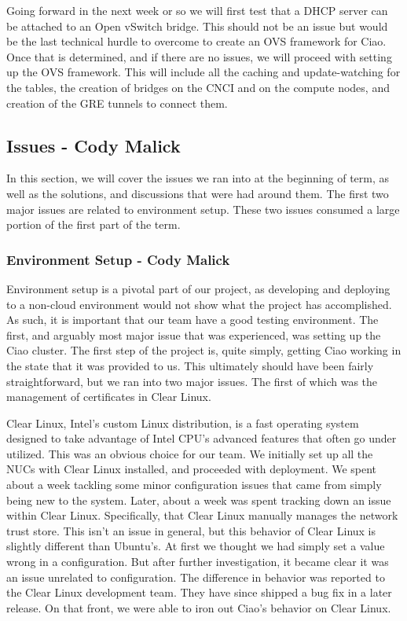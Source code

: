 \documentclass[10pt,onecolumn,journal,draftclsnofoot]{IEEEtran}
\begin{document}
Going forward in the next week or so we will first test that a DHCP server can
be attached to an Open vSwitch bridge. This should not be an issue but would be
the last technical hurdle to overcome to create an OVS framework for Ciao. Once
that is determined, and if there are no issues, we will proceed with setting up
the OVS framework. This will include all the caching and update-watching for
the tables, the creation of bridges on the CNCI and on the compute nodes, and
creation of the GRE tunnels to connect them.

\subsection{Issues - Cody Malick}
In this section, we will cover the issues we ran into at the beginning of term,
as well as the solutions, and discussions that were had around them. The first
two major issues are related to environment setup. These two issues consumed a
large portion of the first part of the term.

\subsubsection{Environment Setup - Cody Malick}
Environment setup is a pivotal part of our project, as developing and deploying
to a non-cloud environment would not show what the project has accomplished.
As such, it is important that our team have a good testing
environment. The first, and arguably most major issue that was experienced,
was setting up the Ciao cluster. The first step of the project is, quite simply,
getting Ciao working in the state that it was provided to us. This ultimately
should have been fairly straightforward, but we ran into two major issues. 
The first of which was the management of certificates in Clear Linux.

Clear Linux, Intel's custom Linux distribution, is a fast operating system
designed to take advantage of Intel CPU's advanced features that often go
under utilized. This was an obvious choice for our team. We initially set up
all the NUCs with Clear Linux installed, and proceeded with deployment.
We spent about a week tackling some minor configuration issues that came from
simply being new to the system. Later, about a week was spent tracking down an
issue within Clear Linux. Specifically, that Clear Linux manually manages the
network trust store. This isn't an issue in general, but this behavior of Clear
Linux is slightly different than Ubuntu's. At first we thought we had simply
set a value wrong in a configuration. But after further investigation, it
became clear it was an issue unrelated to configuration. The difference in 
behavior was reported to the Clear Linux development team. They have since
shipped a bug fix in a later release. On that front, we were able to iron out
Ciao's behavior on Clear Linux.
\end{document}
